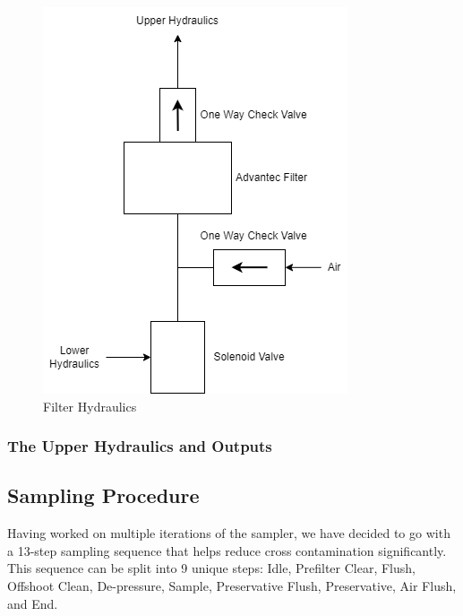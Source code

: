 \documentclass[11pt, letterpaper]{article}
\begin{document}
\begin{figure}[H]
	\centering
	\includegraphics[scale=0.75]{./Assets/PolyWAG_HX_HD_Filter.png}
	\caption{Filter Hydraulics}
\end{figure}

\subsubsection{The Upper Hydraulics and Outputs}



\subsection{Sampling Procedure}
Having worked on multiple iterations of the sampler, we have decided to go with a 13-step sampling sequence that helps reduce cross contamination significantly. This sequence can be split into 9 unique steps: Idle, Prefilter Clear, Flush, Offshoot Clean, De-pressure, Sample, Preservative Flush, Preservative, Air Flush, and End.


\end{document}
